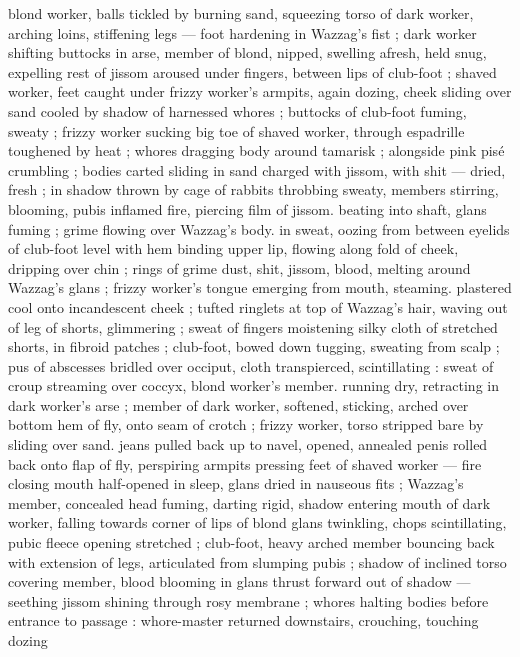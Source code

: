 blond worker, balls tickled by burning sand, squeezing torso of dark 
worker, arching loins, stiffening legs --- foot hardening in Wazzag's 
fist ; dark worker shifting buttocks {\col} in arse, member of blond, 
nipped, swelling afresh, held snug, expelling rest of jissom aroused 
under fingers, between lips of club-foot ; shaved worker, feet caught 
under frizzy worker's armpits, again dozing, cheek sliding over sand 
cooled by shadow of harnessed whores ; buttocks of club-foot 
fuming, sweaty ; frizzy worker sucking big toe of shaved worker, 
through espadrille toughened by heat ; whores dragging body 
around tamarisk ; alongside pink pis\'{e} crumbling ; bodies carted 
sliding in sand charged with jissom, with shit --- dried, fresh ; in 
shadow thrown by cage of rabbits throbbing sweaty, members 
stirring, blooming, pubis inflamed {\col} fire, piercing film of jissom. 
beating into shaft, glans fuming ; grime flowing over Wazzag's body. 
in sweat, oozing from between eyelids of club-foot level with hem 
binding upper lip, flowing along fold of cheek, dripping over chin ; 
rings of grime {\col} dust, shit, jissom, blood, melting around Wazzag's 
glans ; frizzy worker's tongue emerging from mouth, steaming. 
plastered cool onto incandescent cheek ; tufted ringlets at top of 
Wazzag's hair, waving out of leg of shorts, glimmering ; sweat of 
fingers moistening silky cloth of stretched shorts, in fibroid patches 
; club-foot, bowed down tugging, sweating from scalp ; pus of 
abscesses bridled over occiput, cloth transpierced, scintillating : 
sweat of croup streaming over coccyx, blond worker's member. 
running dry, retracting in dark worker's arse ; member of dark 
worker, softened, sticking, arched over bottom hem of fly, onto seam 
of crotch ; frizzy worker, torso stripped bare by sliding over sand. 
jeans pulled back up to navel, opened, annealed penis rolled back 
onto flap of fly, perspiring armpits pressing feet of shaved worker --- 
fire closing mouth half-opened in sleep, glans dried in nauseous fits 
; Wazzag's member, concealed head fuming, darting rigid, shadow 
entering mouth of dark worker, falling towards corner of lips of 
blond {\col} glans twinkling, chops scintillating, pubic fleece opening 
stretched ; club-foot, heavy arched member bouncing back with 
extension of legs, articulated from slumping pubis ; shadow of 
inclined torso covering member, blood blooming in glans thrust 
forward out of shadow --- seething jissom shining through rosy 
membrane ; whores halting bodies before entrance to passage : 
whore-master returned downstairs, crouching, touching dozing 
